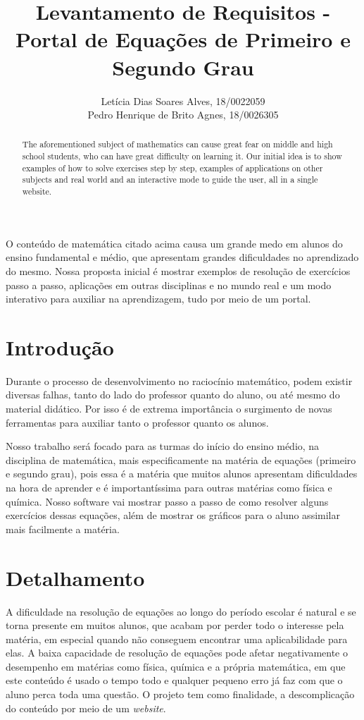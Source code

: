 \documentclass[12pt]{article}
\title{Levantamento de Requisitos - Portal de Equações de Primeiro e Segundo Grau}
\author{Letícia Dias Soares Alves, 18/0022059\\
	Pedro Henrique de Brito Agnes, 18/0026305
}
\begin{document}
 
\maketitle

 \begin{abstract}
   The aforementioned subject of mathematics can cause great fear on middle and high school students, who can have great difficulty on learning it. Our initial idea is to show examples of how to solve exercises step by step, examples of applications on other subjects and real world and an interactive mode to guide the user, all in a single website.
 \end{abstract}

 \begin{resumo} 
   O conteúdo de matemática citado acima causa um grande medo em alunos do ensino fundamental e médio, que apresentam grandes dificuldades no aprendizado do mesmo. Nossa proposta inicial é mostrar exemplos de resolução de exercícios passo a passo, aplicações em outras disciplinas e no mundo real e um modo interativo para auxiliar na aprendizagem, tudo por meio de um portal.
 \end{resumo}

\section{Introdução}
  Durante o processo de desenvolvimento no raciocínio matemático, podem existir diversas falhas, tanto do lado do professor quanto do aluno, ou até mesmo do material didático. Por isso é de extrema importância o surgimento de novas ferramentas para auxiliar tanto o professor quanto os alunos.

  Nosso trabalho será focado para as turmas do início do ensino médio, na disciplina de matemática, mais especificamente na matéria de equações (primeiro e segundo grau), pois essa é a matéria que muitos alunos apresentam dificuldades na hora de aprender e é importantíssima para outras matérias como física e química. Nosso software vai mostrar passo a passo de como resolver alguns exercícios dessas equações, além de mostrar os gráficos para o aluno assimilar mais facilmente a matéria.

\section{Detalhamento}
  A dificuldade na resolução de equações ao longo do período escolar é natural e se torna presente em muitos alunos, que acabam por perder todo o interesse pela matéria, em especial quando não conseguem encontrar uma aplicabilidade para elas. A baixa capacidade de resolução de equações pode afetar negativamente o desempenho em matérias como física, química e a própria matemática, em que este conteúdo é usado o tempo todo e qualquer pequeno erro já faz com que o aluno perca toda uma questão. O projeto tem como finalidade, a descomplicação do conteúdo por meio de um \textit{website}.
\end{document}
